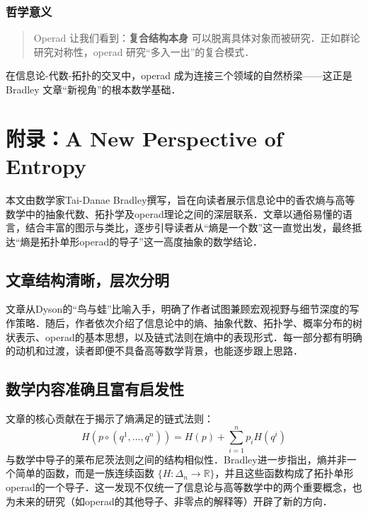 \documentclass[10pt, openany]{book}
\begin{document}
\subsection{哲学意义}

\begin{quote}
    Operad 让我们看到：\textbf{复合结构本身} 可以脱离具体对象而被研究．正如群论研究对称性，operad 研究“多入一出”的复合模式．
\end{quote}

在信息论-代数-拓扑的交叉中，operad 成为连接三个领域的自然桥梁——这正是 Bradley 文章“新视角”的根本数学基础．



\backmatter

\appendix

\chapter{附录：A New Perspective of Entropy}

\cite{Bradley2022EntropyVideo}

本文由数学家Tai-Danae Bradley撰写，旨在向读者展示信息论中的香农熵与高等数学中的抽象代数、拓扑学及operad理论之间的深层联系．文章以通俗易懂的语言，结合丰富的图示与类比，逐步引导读者从“熵是一个数”这一直觉出发，最终抵达“熵是拓扑单形operad的导子”这一高度抽象的数学结论．

\section{文章结构清晰，层次分明}

文章从Dyson的“鸟与蛙”比喻入手，明确了作者试图兼顾宏观视野与细节深度的写作策略．随后，作者依次介绍了信息论中的熵、抽象代数、拓扑学、概率分布的树状表示、operad的基本思想，以及链式法则在熵中的表现形式．每一部分都有明确的动机和过渡，读者即便不具备高等数学背景，也能逐步跟上思路．

\section{数学内容准确且富有启发性}

文章的核心贡献在于揭示了熵满足的链式法则：
\[
H(p \circ (q^1, \dots, q^n)) = H(p) + \sum_{i=1}^n p_i H(q^i)
\]
与数学中导子的莱布尼茨法则之间的结构相似性．Bradley进一步指出，熵并非一个简单的函数，而是一族连续函数 \(\{H: \Delta_n \to \mathbb{R}\}\)，并且这些函数构成了拓扑单形operad的一个导子．这一发现不仅统一了信息论与高等数学中的两个重要概念，也为未来的研究（如operad的其他导子、非零点的解释等）开辟了新的方向．
\end{document}
